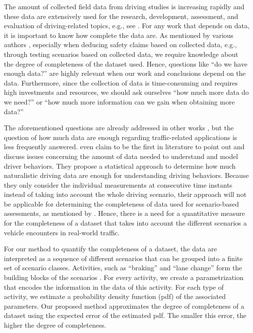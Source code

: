 The amount of collected field data from driving studies is increasing rapidly and these data are extensively used for the research, development, assessment, and evaluation of driving-related topics, e.g., see \textcite{dingus2016crashrisk, klauer2006impact, williamson2011link, sadigh2014data, broggi2013extensive, zofka2015datadrivetrafficscenarios, elrofai2018scenario, deGelder2017assessment, ploeg2018cetran, putz2017pegasus, krajewski2018highD}. For any work that depends on data, it is important to know how complete the data are. As mentioned by various authors \cite{geyer2014, stellet2015taxonomy, alvarez2017prospective}, especially when deducing safety claims based on collected data, e.g., through testing scenarios based on collected data, we require knowledge about the degree of completeness of the dataset used. Hence, questions like ``do we have enough data?'' are highly relevant when our work and conclusions depend on the data. Furthermore, since the collection of data is time-consuming and requires high investments and resources, we should ask ourselves ``how much more data do we need?'' or ``how much more information can we gain when obtaining more data?''

The aforementioned questions are already addressed in other works \cite{guest2006many, blair2004evolution, marks2018howmuch, yang2012estimating, wang2017much}, but the question of how much data are enough regarding traffic-related applications is less frequently answered. \textcite{wang2017much} even claim to be the first in literature to point out and discuss issues concerning the amount of data needed to understand and model driver behaviors. They propose a statistical approach to determine how much naturalistic driving data are enough for understanding driving behaviors. Because they only consider the individual measurements at consecutive time instants instead of taking into account the whole driving scenario, their approach will not be applicable for determining the completeness of data used for scenario-based assessments, as mentioned by \textcite{stellet2015taxonomy, alvarez2017prospective, elrofai2018scenario, ploeg2018cetran, geyer2014}. Hence, there is a need for a quantitative measure for the completeness of a dataset that takes into account the different scenarios a vehicle encounters in real-world traffic.

For our method to quantify the completeness of a dataset, the data are interpreted as a sequence of different scenarios that can be grouped into a finite set of scenario classes. Activities, such as ``braking'' and ``lane change'' form the building blocks of the scenarios \cite{elrofai2018scenario}. For every activity, we create a parametrization that encodes the information in the data of this activity. For each type of activity, we estimate a probability density function (pdf) of the associated parameters. Our proposed method approximates the degree of completeness of a dataset using the expected error of the estimated pdf. The smaller this error, the higher the degree of completeness.

